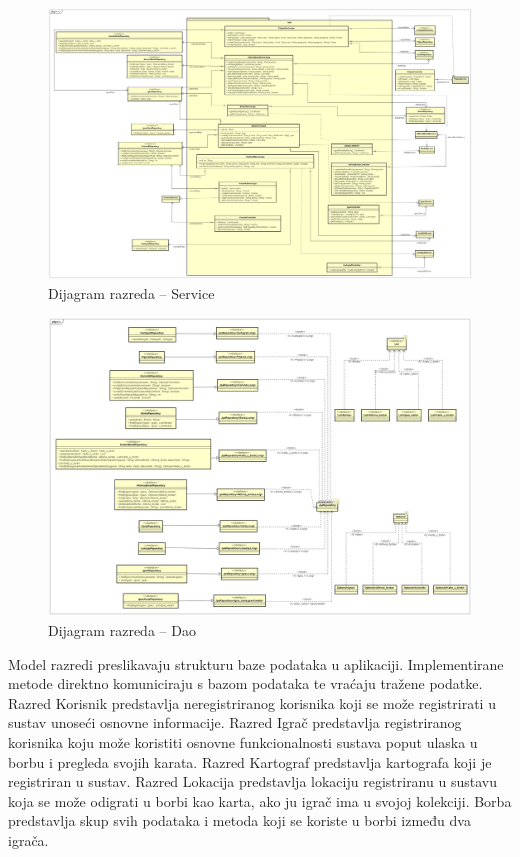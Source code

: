 \begin{itemize}
		\begin{figure}[H]
			\includegraphics[width=\textwidth]{slike/service.png}
			\centering
			\caption{Dijagram razreda – Service}
			\label{fig:promjene}
		\end{figure}

		\begin{figure}[H]
			\includegraphics[width=\textwidth]{slike/Dao.png}
			\centering
			\caption{Dijagram razreda – Dao}
			\label{fig:promjene}
		\end{figure}
		\pagebreak
		Model razredi preslikavaju strukturu baze podataka u aplikaciji. Implementirane metode direktno komuniciraju s bazom podataka te vraćaju tražene podatke. Razred Korisnik predstavlja neregistriranog korisnika koji se može registrirati u sustav unoseći osnovne informacije. Razred Igrač predstavlja registriranog korisnika koju može koristiti osnovne funkcionalnosti sustava poput ulaska u borbu i pregleda svojih karata. Razred Kartograf predstavlja kartografa koji je registriran u sustav. Razred Lokacija predstavlja lokaciju registriranu u sustavu koja se može odigrati u borbi kao karta, ako ju igrač ima u svojoj kolekciji. Borba predstavlja skup svih podataka i metoda koji se koriste u borbi između dva igrača.


\end{itemize}
